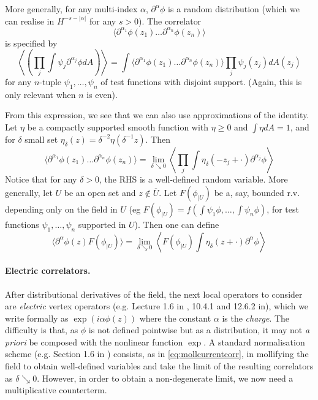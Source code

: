 \documentclass[10pt]{article}
\begin{document}
More generally, for any multi-index $\alpha$, $\partial^\alpha\phi$ is a random distribution (which we can realise in $H^{-s-|\alpha|}$ for any $s>0$). The correlator
$$\langle \partial^{\alpha_1}\phi(z_1)\dots\partial^{\alpha_{n}}\phi(z_n)\rangle$$
is specified by
$$\left\langle\left(\prod_j\int\psi_j\partial^{\alpha_j}\phi dA\right)\right\rangle=\int \langle \partial^{\alpha_1}\phi(z_1)\dots\partial^{\alpha_{n}}\phi(z_n)\rangle\prod_j\psi_j(z_j)dA(z_j)$$
 for any $n$-tuple $\psi_1,\dots,\psi_n$ of test functions with disjoint support. (Again, this is only relevant when $n$ is even).

From this expression, we see that we can also use approximations of the identity. Let $\eta$ be a compactly supported smooth function with $\eta\geq 0$ and $\int\eta dA=1$, and for $\delta$ small set $\eta_\delta(z)=\delta^{-2}\eta(\delta^{-1}z)$. Then
\begin{equation}\label{eq:mollcurrentcorr}
\langle \partial^{\alpha_1}\phi(z_1)\dots\partial^{\alpha_{n}}\phi(z_n)\rangle=\lim_{\delta\searrow 0}\left\langle\prod_j\int \eta_\delta(-z_j+\cdot)
\partial^{\alpha_j}\phi
\right\rangle
\end{equation}
Notice that for any $\delta>0$, the RHS is a well-defined random variable. More generally, let $U$ be an open set and $z\notin\overline U$. Let $F(\phi_{|U})$ be a, say, bounded r.v. depending only on the field in $U$ (eg $F(\phi_{|U})=f(\int\psi_1\phi,\dots,\int\psi_n\phi)$, for test functions $\psi_1,\dots,\psi_n$ supported in $U$). Then one can define
$$\langle \partial^{\alpha}\phi(z)F(\phi_{|U})\rangle=\lim_{\delta\searrow 0}\left\langle F(\phi_{|U})\int \eta_\delta(z+\cdot)
\partial^{\alpha}\phi
\right\rangle$$

\paragraph{Electric correlators.\\}
After distributional derivatives of the field, the next local operators to consider are {\em electric} vertex operators (e.g. Lecture 1.6 in \cite{Gaw_CFT}, 10.4.1 and 12.6.2 in\cite{DiF}), which we write formally as $\exp(i\alpha \phi(z))$ where the constant $\alpha$ is the {\em charge}. The difficulty is that, as $\phi$ is not defined pointwise but as a distribution, it may not {\em a priori} be composed with the nonlinear function $\exp$. %
A standard normalisation scheme (e.g. Section 1.6 in \cite{Gaw_CFT}) consists, as in \eqref{eq:mollcurrentcorr}, in mollifying the field to obtain well-defined variables and take the limit of the resulting correlators as $\delta\searrow 0$. However, in order to obtain a non-degenerate limit, we now need a multiplicative counterterm. 
\end{document}
